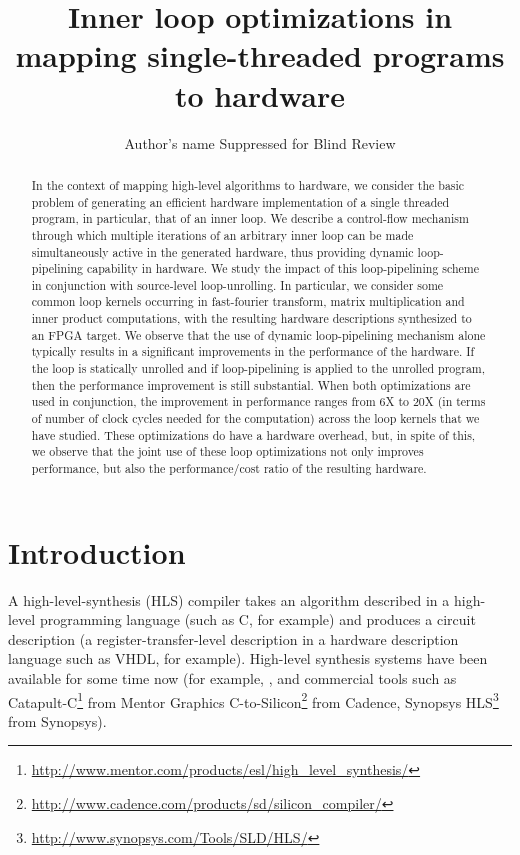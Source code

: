\documentclass[conference]{IEEEtran}
\title{Inner loop optimizations in mapping single-threaded programs to hardware}
\author{Author's name Suppressed for Blind Review}
\begin{document}
\maketitle
\thispagestyle{empty}

\begin{abstract}

  In the context of mapping high-level algorithms to hardware,
  we consider the basic problem of generating an efficient hardware 
  implementation of a single threaded program, in particular, that
  of an inner loop.  
  We describe a control-flow mechanism through
  which multiple iterations of an arbitrary inner loop can be made simultaneously
  active in the generated hardware, thus providing dynamic loop-pipelining
  capability in hardware.   
  We study the impact of this loop-pipelining scheme in conjunction with
  source-level loop-unrolling.
  In particular, we consider some common loop kernels occurring in fast-fourier transform,
  matrix multiplication and inner product computations, with the resulting
  hardware descriptions synthesized to an FPGA target.  We observe
  that the use of dynamic loop-pipelining mechanism alone typically results in
  a significant improvements in the performance of the hardware.  If the loop is
  statically unrolled and if loop-pipelining is applied to the unrolled
  program, then the performance improvement is still substantial.  When
  both optimizations are used in conjunction, the improvement in performance
  ranges from 6X to 20X (in terms of number of clock cycles needed for the computation)
  across the loop kernels that we have studied.
  These optimizations do have a hardware overhead, but,
  in spite of this, we observe that the joint use of these 
  loop optimizations not only improves performance, but also the 
  performance/cost ratio of the resulting hardware.
 

\end{abstract}

\section{Introduction}

A high-level-synthesis (HLS) compiler takes an algorithm described in
a high-level programming language (such as C, for example) and produces a circuit
description (a register-transfer-level description in a hardware
description language such as VHDL, for example).
High-level synthesis systems have been available for some time
now (for example, \cite{pegasus-cash}, \cite{spark-vlsi-paper} and
commercial tools such as Catapult-C\footnote{\url{http://www.mentor.com/products/esl/high_level_synthesis/}} from Mentor Graphics
C-to-Silicon\footnote{\url{http://www.cadence.com/products/sd/silicon_compiler/}} from Cadence,
Synopsys HLS\footnote{\url{http://www.synopsys.com/Tools/SLD/HLS/}} from Synopsys).
\end{document}

